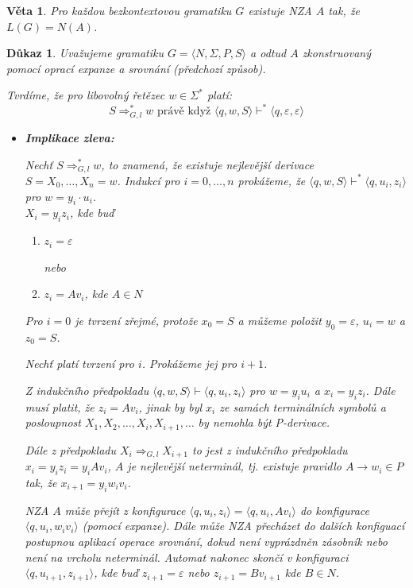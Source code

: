 \documentclass[10pt, a4paper, titlepage]{article}
\theoremstyle{note}
\newtheorem{veta}{\textbf{Věta}}
\newtheorem{dukaz}{\textbf{Důkaz}}
\begin{document}
\begin{veta}
Pro každou bezkontextovou gramatiku $G$ existuje NZA $A$ tak, že $L(G)=N(A)$.
\end{veta}

\begin{dukaz}
Uvažujeme gramatiku $G=\langle N,\Sigma,P,S \rangle$ a odtud $A$ zkonstruovaný pomocí oprací expanze a srovnání (předchozí způsob).

Tvrdíme, že pro libovolný řetězec $w \in \Sigma^*$ platí:
$$
S \Rightarrow_{G,l}^* w \text{ právě když } \langle q,w,S \rangle \vdash^* \langle q,\varepsilon,\varepsilon \rangle
$$

\begin{itemize}
\item
\textbf{Implikace zleva:}

Nechť $S \Rightarrow_{G,l}^* w$, to znamená, že existuje nejlevější derivace $S=X_0,\ldots,X_n=w$. Indukcí pro $i=0,\ldots,n$ prokážeme, že $\langle q,w,S \rangle \vdash^* \langle q,u_i,z_i \rangle$ pro $w = y_i\cdot u_i$. \\
$X_i=y_iz_i$, kde buď 
\begin{enumerate}
\item
$z_i = \varepsilon$

nebo
\item
$z_i=Av_i$, kde $A \in N$
\end{enumerate}

Pro $i=0$ je tvrzení zřejmé, protože $x_0=S$ a můžeme položit $y_0=\varepsilon$, $u_i=w$ a $z_0=S$.

Nechť platí tvrzení pro $i$. Prokážeme jej pro $i+1$.

Z indukčního předpokladu $\langle q,w,S \rangle \vdash \langle q,u_i,z_i \rangle$ pro $w=y_iu_i$ a $x_i=y_iz_i$. Dále musí platit, že $z_i=Av_i$, jinak by byl $x_i$ ze samách terminálních symbolů a posloupnost $X_1,X_2,\ldots,X_i,X_{i+1},\ldots$ by nemohla být P-derivace.

Dále z předpokladu $X_i \Rightarrow_{G,l}X_{i+1}$ to jest z indukčního předpokladu $x_i=y_iz_i=y_iAv_i$, $A$ je nejlevější neterminál, tj. existuje pravidlo $A \rightarrow w_i \in P$ tak, že $x_{i+1}=y_iw_iv_i$.

NZA $A$ může přejít z konfigurace $\langle q,u_i,z_i \rangle = \langle q,u_i,Av_i \rangle$ do konfigurace $\langle q,u_i,w_iv_i \rangle$ (pomocí expanze). Dále může NZA přecházet do dalších konfiguací postupnou aplikací operace srovnání, dokud není vyprázdněn zásobník nebo není na vrcholu neterminál.
Automat nakonec skončí v konfiguraci $\langle q,u_{i+1},z_{i+1} \rangle$, kde buď $z_{i+1}=\varepsilon$ nebo $z_{i+1}=Bv_{i+1}$ kde $B \in N$.


\end{itemize}
\end{dukaz}
\end{document}

